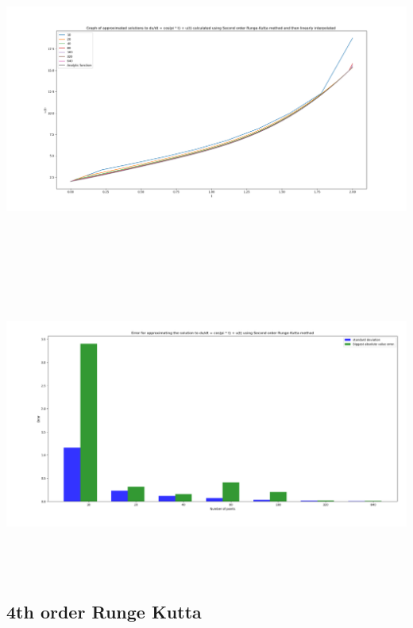 \documentclass[10pt]{article}
\begin{document}
\begin{center}
\includegraphics[angle=0,height=10cm]{./img/runge_2_function.png}
\end{center}

\begin{center}
\includegraphics[angle=0,height=10cm]{./img/runge_2_error.png}
\end{center}




\subsection{4th order Runge Kutta}
\label{sec:orga9452c8}
\end{document}
